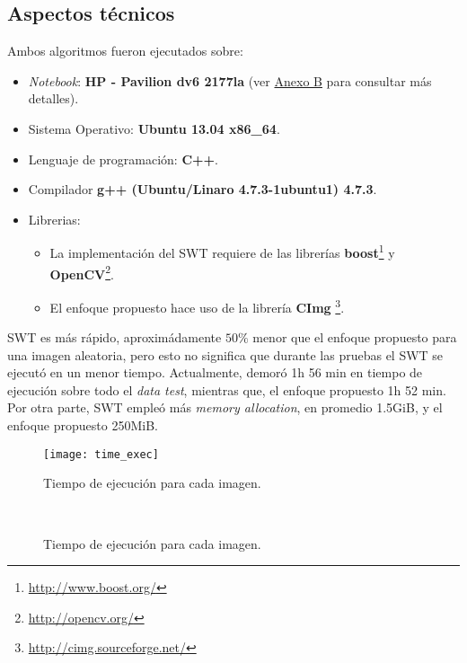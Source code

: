 \subsection{Aspectos técnicos}
Ambos algoritmos fueron ejecutados sobre:
\begin{itemize}
	\item \textit{Notebook}: \textbf{HP - Pavilion dv6 2177la} (ver 
	\hyperlink{page.86}{Anexo B} para consultar más detalles).
	\item Sistema Operativo: \textbf{Ubuntu 13.04 x86\_64}.
	\item Lenguaje de programación: \textbf{C++}.
	\item Compilador \textbf{g++ (Ubuntu/Linaro 4.7.3-1ubuntu1) 4.7.3}.
	\item Librerias:
	\begin{itemize}
		\item La implementación del SWT requiere de las librerías 
		\textbf{boost}\footnote{\url{http://www.boost.org/}} y
\textbf{OpenCV}\footnote{\url{http://opencv.org/}}.
		\item El enfoque propuesto hace uso de la librería \textbf{CImg}
		\footnote{\url{http://cimg.sourceforge.net/}}.
	\end{itemize}
\end{itemize}  

SWT es más rápido, aproximádamente $50\%$ menor que el enfoque propuesto para
una imagen aleatoria, pero esto no significa que durante las pruebas el SWT se
ejecutó en un menor tiempo. Actualmente, demoró 1h 56 min en tiempo de ejecución
sobre todo el \textit{data test}, mientras que, el enfoque propuesto 1h 52 min.
Por otra parte, SWT empleó más \textit{memory allocation}, en promedio 1.5GiB, y
el enfoque propuesto 250MiB.


\begin{figure}[h!]
	\texttt{[image: time\_exec]}
	\caption{Tiempo de ejecución para cada imagen.}
	\label{fig:cap-resultados:time_exec}
\end{figure}

\begin{figure}[h!]
	\centering
	\\
	\caption{Tiempo de ejecución para cada imagen.}
	\label{fig:cap-resultados:time_size}
\end{figure}
